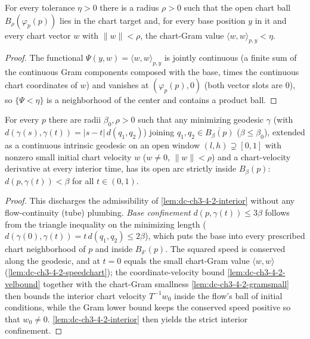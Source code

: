 \begin{lemma}
  \label{lem:dc-ch3-4-2-gramsmall}


  For every tolerance $\eta>0$ there is a radius $\rho>0$ such that the open chart ball
  $B_\rho(\varphi_p(p))$ lies in the chart target and, for every base position $y$ in it and every
  chart vector $w$ with $\|w\|<\rho$, the chart-Gram value $\langle w,w\rangle_{p,y}<\eta$.
\end{lemma}
\begin{proof}
  \sketch

  The functional $\Psi(y,w)=\langle w,w\rangle_{p,y}$ is jointly continuous (a finite sum of the
  continuous Gram components composed with the base, times the continuous chart coordinates of $w$)
  and vanishes at $(\varphi_p(p),0)$ (both vector slots are $0$), so $\{\Psi<\eta\}$ is a
  neighborhood of the center and contains a product ball.
\end{proof}

\begin{lemma}
  \label{lem:dc-ch3-4-2-interior-minimizing}


  For every $p$ there are radii $\beta_0,\rho>0$ such that any minimizing geodesic $\gamma$
  (with $d(\gamma(s),\gamma(t))=|s-t|\,d(q_1,q_2)$) joining $q_1,q_2\in\overline{B_\beta(p)}$
  ($\beta\le\beta_0$), extended as a continuous intrinsic geodesic on an open window
  $(l,h)\supsetneq[0,1]$ with nonzero small initial chart velocity $w$ ($w\neq0$, $\|w\|<\rho$) and a
  chart-velocity derivative at every interior time, has its open arc strictly inside $B_\beta(p)$:
  $d(p,\gamma(t))<\beta$ for all $t\in(0,1)$.
\end{lemma}
\begin{proof}
  \sketch

  This discharges the admissibility of \cref{lem:dc-ch3-4-2-interior} without any flow-continuity
  (tube) plumbing. \emph{Base confinement} $d(p,\gamma(t))\le3\beta$ follows from the triangle
  inequality on the minimizing length ($d(\gamma(0),\gamma(t))=t\,d(q_1,q_2)\le2\beta$), which puts
  the base into every prescribed chart neighborhood of $p$ and inside $B_{\delta'}(p)$. The squared
  speed is conserved along the geodesic, and at $t=0$ equals the small chart-Gram value
  $\langle w,w\rangle$ (\cref{lem:dc-ch3-4-2-speedchart}); the coordinate-velocity bound
  \cref{lem:dc-ch3-4-2-velbound} together with the chart-Gram smallness \cref{lem:dc-ch3-4-2-gramsmall}
  then bounds the interior chart velocity $T^{-1}w_0$ inside the flow's ball of initial conditions,
  while the Gram lower bound keeps the conserved speed positive so that $w_0\neq0$.
  \cref{lem:dc-ch3-4-2-interior} then yields the strict interior confinement.
\end{proof}

